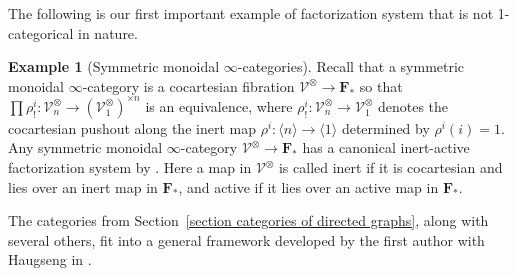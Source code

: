 \documentclass{amsart}
\numberwithin{theorem}{subsection}
\theoremstyle{definition}
\newtheorem{example}[theorem]{Example}
\newcommand{\finsetskel}{\mathbf{F}}
\newcommand{\pfinsetskel}{\finsetskel_*}
\newcommand{\xV}{\mathcal{V}}
\newcommand{\icat}{$\infty$-category}
\begin{document}
The following is our first important example of factorization system that is not 1-categorical in nature.

\begin{example}[Symmetric monoidal $\infty$-categories]\label{example fact system smc}
Recall that a symmetric monoidal \icat{} is a cocartesian fibration $\xV^\otimes \to \pfinsetskel$ so that $\prod \rho^i_! \colon \xV^{\otimes}_n \to (\xV^{\otimes}_1)^{\times n}$ is an equivalence, where $\rho^i_!\colon \xV^\otimes_n\to \xV^\otimes_1$ denotes the cocartesian pushout along the inert map $\rho^i\colon \langle n\rangle \to \langle 1\rangle$ determined by $\rho^i(i)=1$.
Any symmetric monoidal $\infty$-category $\xV^{\otimes} \to \pfinsetskel$ has a canonical inert-active factorization system by \cite[Proposition 2.1.2.4]{ha}. 
Here a map in $\xV^\otimes$ is called inert if it is cocartesian and lies over an inert map in $\pfinsetskel$, and active if it lies over an active map in $\pfinsetskel$. 
\end{example}

The categories from Section~\ref{section categories of directed graphs}, along with several others, fit into a general framework developed by the first author with Haugseng in \cite{patterns1}.
\end{document}
